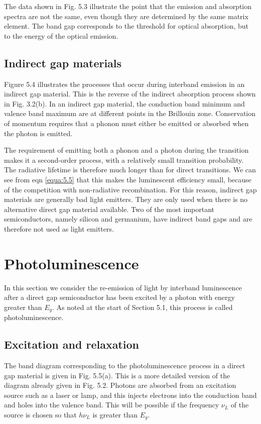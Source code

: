 \documentclass[12pt]{book}
\begin{document}
The data shown in Fig. 5.3 illustrate the point that the emission and absorption spectra are not the same, even though they are determined by the same matrix element. The band gap corresponds to the threshold for optical absorption, but to the energy of the optical emission.

\subsection{Indirect gap materials}
Figure 5.4 illustrates the processes that occur during interband emission in an indirect gap material. This is the reverse of the indirect absorption process shown in Fig. 3.2(b). In an indirect gap material, the conduction band minimum and valence band maximum are at different points in the Brillouin zone. Conservation of momentum requires that a phonon must either be emitted or absorbed when the photon is emitted.

The requirement of emitting both a phonon and a photon during the transition makes it a second-order process, with a relatively small transition probability. The radiative lifetime is therefore much longer than for direct transitions. We can see from eqn \ref{equa:5.5} that this makes the luminescent efficiency small, because of the competition with non-radiative recombination. For this reason, indirect gap materials are generally bad light emitters. They are only used when there is no alternative direct gap material available. Two of the most important semiconductors, namely silicon and germanium, have indirect band gaps and are therefore not used as light emitters.

\section{Photoluminescence}
In this section we consider the re-emission of light by interband luminescence after a direct gap semiconductor has been excited by a photon with energy greater than $E_g$. As noted at the start of Section 5.1, this process is called photoluminescence.
\subsection{Excitation and relaxation}
The band diagram corresponding to the photoluminescence process in a direct gap material is given in Fig. 5.5(a). This is a more detailed version of the diagram already given in Fig. 5.2. Photons are absorbed from an excitation source such as a laser or lamp, and this injects electrons into the conduction band and holes into the valence band. This will be possible if the frequency $\nu_L$ of the source is chosen so that $h\nu_L$ is greater than $E_g$.
\end{document}
